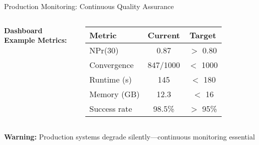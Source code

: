 \documentclass[aspectratio=169]{beamer}
\newcommand{\warning}[1]{\colorbox{red!10}{\textcolor{warningcolor}{\textbf{Warning:} #1}}}
\begin{document}
\begin{frame}{Production Monitoring: Continuous Quality Assurance}
\begin{columns}
\vspace{0.2cm}
\textbf{Dashboard Example Metrics:}

\begin{tabular}{l|c|c}
\textbf{Metric} & \textbf{Current} & \textbf{Target}\\
\hline
NPr(30) & 0.87 & $>$ 0.80\\
Convergence & 847/1000 & $<$ 1000\\
Runtime (s) & 145 & $<$ 180\\
Memory (GB) & 12.3 & $<$ 16\\
Success rate & 98.5\% & $>$ 95\%
  \end{tabular}
\end{columns}

\vspace{0.3cm}
\warning{Production systems degrade silently—continuous monitoring essential}
\end{frame}
\end{document}
